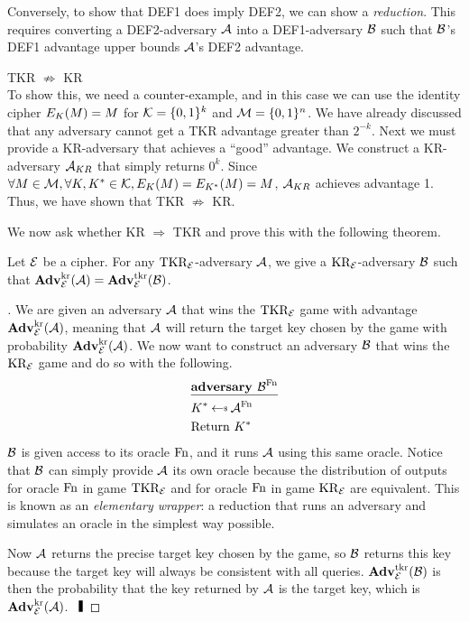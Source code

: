 Conversely, to show that DEF1 does imply DEF2, we can show a \textit{reduction}. This requires converting a DEF2-adversary ${\mathcal A}$ into a DEF1-adversary ${\mathcal B}$ such that ${\mathcal B}$'s DEF1 advantage upper bounds ${\mathcal A}$'s DEF2 advantage. 

\begin{example}
TKR $\not \Rightarrow$ KR \\
To show this, we need a counter-example, and in this case we can use the identity cipher $E_{K}(M) = M$ for ${\cal K}=\{0,1\}^k$ and ${\cal M}=\{0,1\}^n$. 
We have already discussed that any adversary cannot get a TKR advantage greater than $2^{-k}$. Next we must provide a KR-adversary that achieves a ``good'' advantage. We construct a KR-adversary ${\mathcal A}_{KR}$ that simply returns $0^k$. Since $\forall M\in{\cal M}, \forall K, K^* \in {\cal K}, E_{K}(M) = E_{K^*}(M) = M$, ${\mathcal A}_{KR}$ achieves advantage 1. Thus, we have shown that TKR $\not \Rightarrow$ KR. \qedsym
\end{example}

We now ask whether KR $\Rightarrow$ TKR and prove this with the following theorem. 

\begin{theorem}
	\label{thm-tkr-kr}
	Let ${\cal E}$ be a cipher. For any $\textnormal{TKR}_{\cal E}$-adversary ${\mathcal A}$, we give a
	$\textnormal{KR}_{\cal E}$-adversary ${\mathcal B}$ such that 
	$\mathbf{Adv}^{\mathrm{kr}}_{{\cal E}}({\mathcal A}) = \mathbf{Adv}^{\mathrm{tkr}}_{{\cal E}}({\mathcal B})$.
\end{theorem}

\begin{proof}[]
	We are given an adversary ${\mathcal A}$ that wins the $\textnormal{TKR}_{\cal E}$ game with advantage $\mathbf{Adv}^{\mathrm{kr}}_{{\cal E}}({\mathcal A})$, meaning that ${\mathcal A}$ will return the target key chosen by the game with probability $\mathbf{Adv}^{\mathrm{kr}}_{{\cal E}}({\mathcal A})$. We now want to construct an adversary ${\mathcal B}$ that wins the $\textnormal{KR}_{\cal E}$ game and do so with the following.
	\begin{align*}
	&\underline{\textbf{adversary } \advB^\Fn} \\
	&K^* \getsr \advA^\Fn \\
	&\text{Return } K^* 
	\end{align*}
	${\mathcal B}$ is given access to its oracle $\textnormal{Fn}$, and it runs ${\mathcal A}$ using this same oracle. Notice that ${\mathcal B}$ can simply provide ${\mathcal A}$ its own oracle because the distribution of outputs for oracle $\textnormal{Fn}$ in game $\textnormal{TKR}_{\cal E}$ and for oracle $\textnormal{Fn}$ in game $\textnormal{KR}_{\cal E}$ are equivalent. This is known as an \textit{elementary wrapper}: a reduction that runs an adversary and simulates an oracle in the simplest way possible. 
	
	Now ${\mathcal A}$ returns the precise target key chosen by the game, so ${\mathcal B}$ returns this key because the target key will always be consistent with all queries. $\mathbf{Adv}^{\mathrm{tkr}}_{{\cal E}}({\mathcal B})$ is then the probability that the key returned by ${\mathcal A}$ is the target key, which is $\mathbf{Adv}^{\mathrm{kr}}_{{\cal E}}({\mathcal A})$. $\qedsym$
\end{proof}



